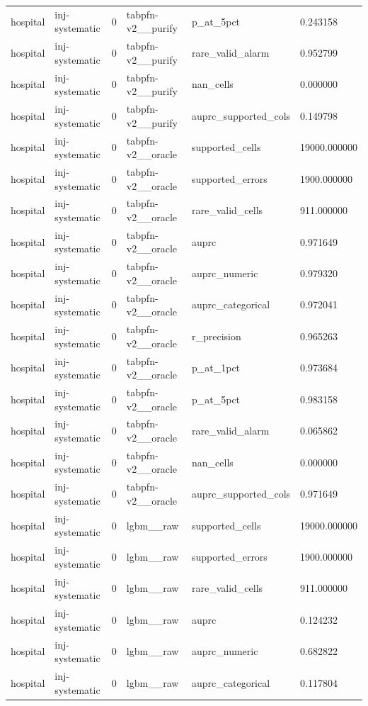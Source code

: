\begin{tabular}{llllll}
hospital & inj-systematic & 0 & tabpfn-v2\_\_purify & p\_at\_5pct & 0.243158 \\
hospital & inj-systematic & 0 & tabpfn-v2\_\_purify & rare\_valid\_alarm & 0.952799 \\
hospital & inj-systematic & 0 & tabpfn-v2\_\_purify & nan\_cells & 0.000000 \\
hospital & inj-systematic & 0 & tabpfn-v2\_\_purify & auprc\_supported\_cols & 0.149798 \\
hospital & inj-systematic & 0 & tabpfn-v2\_\_oracle & supported\_cells & 19000.000000 \\
hospital & inj-systematic & 0 & tabpfn-v2\_\_oracle & supported\_errors & 1900.000000 \\
hospital & inj-systematic & 0 & tabpfn-v2\_\_oracle & rare\_valid\_cells & 911.000000 \\
hospital & inj-systematic & 0 & tabpfn-v2\_\_oracle & auprc & 0.971649 \\
hospital & inj-systematic & 0 & tabpfn-v2\_\_oracle & auprc\_numeric & 0.979320 \\
hospital & inj-systematic & 0 & tabpfn-v2\_\_oracle & auprc\_categorical & 0.972041 \\
hospital & inj-systematic & 0 & tabpfn-v2\_\_oracle & r\_precision & 0.965263 \\
hospital & inj-systematic & 0 & tabpfn-v2\_\_oracle & p\_at\_1pct & 0.973684 \\
hospital & inj-systematic & 0 & tabpfn-v2\_\_oracle & p\_at\_5pct & 0.983158 \\
hospital & inj-systematic & 0 & tabpfn-v2\_\_oracle & rare\_valid\_alarm & 0.065862 \\
hospital & inj-systematic & 0 & tabpfn-v2\_\_oracle & nan\_cells & 0.000000 \\
hospital & inj-systematic & 0 & tabpfn-v2\_\_oracle & auprc\_supported\_cols & 0.971649 \\
hospital & inj-systematic & 0 & lgbm\_\_raw & supported\_cells & 19000.000000 \\
hospital & inj-systematic & 0 & lgbm\_\_raw & supported\_errors & 1900.000000 \\
hospital & inj-systematic & 0 & lgbm\_\_raw & rare\_valid\_cells & 911.000000 \\
hospital & inj-systematic & 0 & lgbm\_\_raw & auprc & 0.124232 \\
hospital & inj-systematic & 0 & lgbm\_\_raw & auprc\_numeric & 0.682822 \\
hospital & inj-systematic & 0 & lgbm\_\_raw & auprc\_categorical & 0.117804 \\

\end{tabular}
